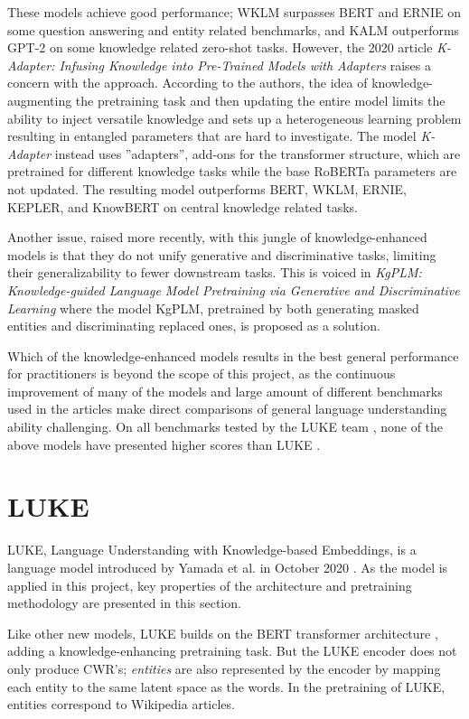\documentclass[main.tex]{subfiles}
\begin{document}
These models achieve good performance; WKLM surpasses BERT and ERNIE on some question answering and entity related benchmarks, and KALM outperforms GPT-2 on some knowledge related zero-shot tasks.
However, the 2020 article \emph{K-Adapter: Infusing Knowledge into Pre-Trained Models with Adapters} \cite{wang2020kadapter} raises a concern with the approach.
According to the authors, the idea of knowledge-augmenting the pretraining task and then updating the entire model limits the ability to inject versatile knowledge and sets up a heterogeneous learning problem resulting in entangled parameters that are hard to investigate.
The model \emph{K-Adapter} instead uses ''adapters'', add-ons for the transformer structure, which are pretrained for different knowledge tasks while the base RoBERTa parameters are not updated.
The resulting model outperforms BERT, WKLM, ERNIE, KEPLER, and KnowBERT on central knowledge related tasks.

Another issue, raised more recently, with this jungle of knowledge-enhanced models is that they do not unify generative and discriminative tasks, limiting their generalizability to fewer downstream tasks.
This is voiced in \emph{KgPLM: Knowledge-guided Language Model Pretraining via Generative and Discriminative Learning} \cite{he2020kgplm} where the model KgPLM, pretrained by both generating masked entities and discriminating replaced ones, is proposed as a solution.

Which of the knowledge-enhanced models results in the best general performance for practitioners is beyond the scope of this project, as the continuous improvement of many of the models and large amount of different benchmarks used in the articles make direct comparisons of general language understanding ability challenging.
On all benchmarks tested by the LUKE team \cite{yamada2020luke}, none of the above models have presented higher scores than LUKE \cite[Sec. 4]{yamada2020luke}.


\section{LUKE}
\label{sec:LUKE}
LUKE, Language Understanding with Knowledge-based Embeddings, is a language model introduced by Yamada et al. in October 2020 \cite{yamada2020luke}.
As the model is applied in this project, key properties of the architecture and pretraining methodology are presented in this section.

Like other new models, LUKE builds on the BERT transformer architecture \cite{devlin2019bert}, adding a knowledge-enhancing pretraining task.
But the LUKE encoder does not only produce CWR's; 
\emph{entities} are also represented by the encoder by mapping each entity to the same latent space as the words.
In the pretraining of LUKE, entities correspond to Wikipedia articles.
\end{document}
